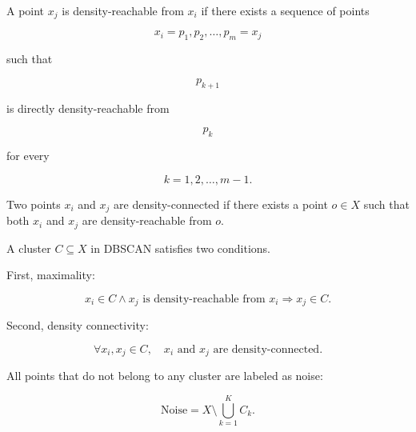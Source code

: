\documentclass{book}
\begin{document}
      A point \(x_j\) is density-reachable from \(x_i\) if there exists a sequence of points

      \[
      x_i = p_1, p_2, \dots, p_m = x_j
      \]

      such that

      \[
      p_{k+1}
      \]

      is directly density-reachable from

      \[
      p_k
      \]

      for every

      \[
      k = 1, 2, \dots, m-1.
      \]

      Two points \(x_i\) and \(x_j\) are density-connected if there exists a point \(o \in X\) such that both \(x_i\) and \(x_j\) are density-reachable from \(o\).

      A cluster \(C \subseteq X\) in DBSCAN satisfies two conditions.

      First, maximality:

      \[
      x_i \in C
      \land
      x_j \text{ is density-reachable from } x_i
      \Rightarrow
      x_j \in C.
      \]

      Second, density connectivity:

      \[
      \forall x_i, x_j \in C,
      \quad
      x_i \text{ and } x_j \text{ are density-connected}.
      \]

      All points that do not belong to any cluster are labeled as noise:

      \[
      \mathrm{Noise}
      =
      X \setminus \bigcup_{k=1}^{K} C_k.
      \]
\end{document}
